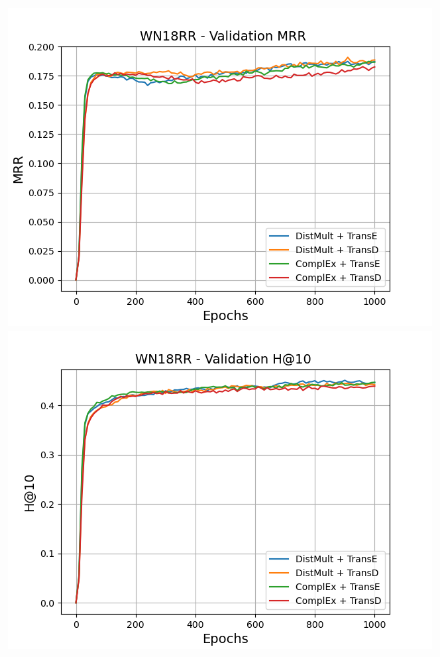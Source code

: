 \begin{figure}
    \centering
    \begin{minipage}{.5\textwidth}
      \centering
      \includegraphics[width=\linewidth]{figures/results/gan_train/not_pretrained/random/wn18rr/epochs1000/random_wn18rr_mrrs.png}
    \end{minipage}%
    \begin{minipage}{.5\textwidth}
      \centering
      \includegraphics[width=\linewidth]{figures/results/gan_train/not_pretrained/random/wn18rr/epochs1000/random_wn18rr_hit10.png}
    \end{minipage}
    

\end{figure}
